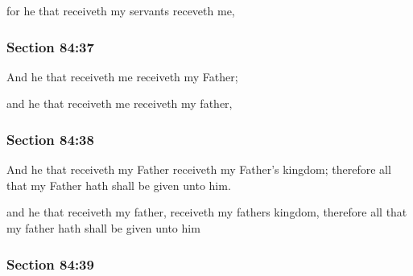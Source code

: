 		\begin{framed}
		\scriptsize
			\begin{compactdesc}
				\item[JSP] for he that receiveth my servants receveth me,
			\end{compactdesc}
		\end{framed}

	\subsubsection{Section 84:37} %
		\label{DC84-37}

		And he that receiveth me receiveth my Father;

		\begin{framed}
		\scriptsize
			\begin{compactdesc}
				\item[JSP] and he that receiveth me receiveth my father,
			\end{compactdesc}
		\end{framed}

	\subsubsection{Section 84:38} %
		\label{DC84-38}

		And he that receiveth my Father receiveth my Father's kingdom; therefore all that my Father hath shall be given unto him.

		\begin{framed}
		\scriptsize
			\begin{compactdesc}
				\item[JSP] and he that receiveth my father, receiveth my fathers kingdom, therefore all that my father hath shall be given unto him
			\end{compactdesc}
		\end{framed}

	\subsubsection{Section 84:39} %
		\label{DC84-39}

